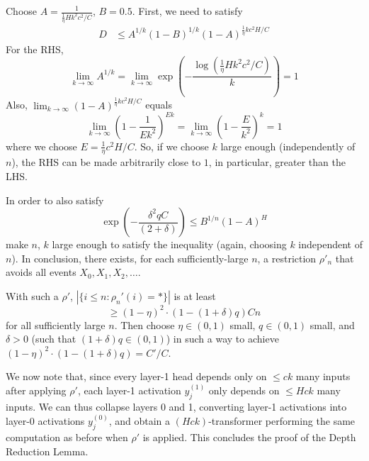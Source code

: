 \documentclass[11pt,a4paper]{article}
\begin{document}
Choose %
$A=\frac{1}{\frac{1}{\eta}Hk^2c^2/C}$, $B=0.5$.
First, we need to satisfy
\begin{align}
    D &\leq A^{1/k}(1-B)^{1/k}(1-A)^{\frac{1}{\eta}kc^2H/C} 
\end{align}
For the RHS, 
\begin{equation}
\lim_{k\rightarrow \infty} A^{1/k} = \lim_{k\rightarrow \infty} \exp\left(-\frac{\log\left(\frac{1}{\eta} H k^2 c^2/C\right)}{k}\right) = 1
\end{equation}
Also, $\lim_{k\rightarrow \infty} (1-A)^{\frac{1}{\eta}kc^2H/C}$ equals
\begin{equation}
\lim_{k\rightarrow \infty} \left(1-\frac{1}{Ek^2}\right)^{Ek} = \lim_{k\rightarrow \infty} \left(1-\frac{E}{k^2}\right)^{k} = 1
\end{equation}
where we choose $E = \frac{1}{\eta}c^2H/C$. So, if we choose $k$ large enough (independently of $n$), the RHS can be made arbitrarily close to $1$, in particular, greater than the LHS.

In order to also satisfy
\begin{equation}
\exp\left(-\frac{\delta^2qC}{(2+\delta)}\right)  \leq B^{1/n} (1-A)^H
\end{equation}
make $n$, $k$ large enough to satisfy the inequality (again, choosing $k$ independent of $n$). %
In conclusion, there exists, for each sufficiently-large $n$, a restriction $\rho'_n$ that avoids all events $X_0, X_1, X_2, \dots$.

With such a $\rho'$, $|\{i \leq n: \rho_n'(i) = *\}|$ is at least
\begin{equation}
\geq (1-\eta)^2\cdot (1-(1+\delta)q) C n
\end{equation}
for all sufficiently large $n$.
Then choose $\eta \in (0,1)$ small, $q \in (0,1)$ small, and $\delta >0$ (such that $(1+\delta)q \in (0,1)$) in such a way to achieve $(1-\eta)^2\cdot (1-(1+\delta)q) = C'/C$.




We now note that, since every layer-1 head depends only on $\leq ck$ many inputs after applying $\rho'$, each layer-1 activation $y_j^{(1)}$ only depends on $\leq Hck$ many inputs.
We can thus collapse layers 0 and 1, converting layer-1 activations into layer-0 activations $y_j^{(0)}$, and obtain a $(Hck)$-transformer performing the same computation as before when $\rho'$ is applied.
This concludes the proof of the Depth Reduction Lemma.
\end{document}
